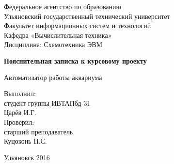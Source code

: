 

\begin{center}
	\renewcommand{\baselinestretch}{1}
	\small
		Федеральное агентство по образованию \\
		Ульяновский государственный технический университет \\
		Факультет информационных систем и технологий \\
		Кафедра «Вычислительная техника» \\
	
	\normalsize
	\vspace{30ex}
	\renewcommand{\baselinestretch}{1.5}
		Дисциплина: Схемотехника ЭВМ
		
	\renewcommand{\baselinestretch}{1.5}
	\large 
		\textbf{Пояснительная записка к курсовому проекту}
		
		Автоматизатор работы аквариума
\end{center}

\vspace{20ex}
\begin{flushright}
	Выполнил: \\
	студент группы ИВТАПбд-31 \\
	Царёв И.Г. \\
	Проверил: \\ 
	старший преподаватель \\
	Куцоконь Н.С.
\end{flushright}

\vfill
\begin{center}
	Ульяновск 2016
\end{center}
